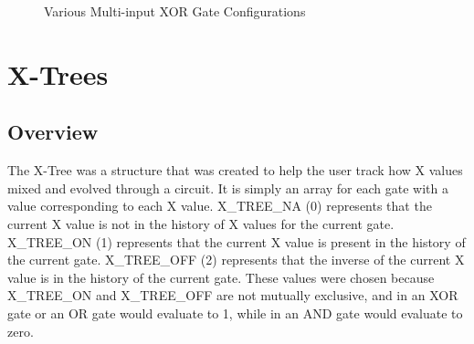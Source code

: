 \documentclass[12pt]{report}
\begin{document}
\begin{figure}[h!]
	\centering
	
	\label{fig:xor-group}
	\caption[Multi-input XOR Gates]{Various Multi-input XOR Gate Configurations}
\end{figure}

\singlespacing
\chapter{X-Trees}\label{sec:xtree}
\doublespacing

\section{Overview}

The X-Tree was a structure that was created to help the user track how X values mixed and evolved through a circuit. It is simply an array for each gate with a value corresponding to each X value. X\_TREE\_NA (0) represents that the current X value is not in the history of X values for the current gate. X\_TREE\_ON (1) represents that the current X value is present in the history of the current gate. X\_TREE\_OFF (2) represents that the inverse of the current X value is in the history of the current gate. These values were chosen because X\_TREE\_ON and X\_TREE\_OFF are not mutually exclusive, and in an XOR gate or an OR gate would evaluate to 1, while in an AND gate would evaluate to zero.
\end{document}
